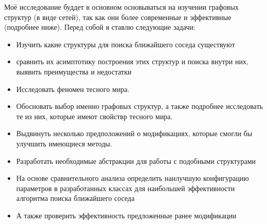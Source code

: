 \begin{justify}
    Моё исследование буддет в основном основываться на изучении
    графовых структур (в виде сетей), так как они более современные
    и эффективные (подробнее ниже). Перед собой я ставлю следующие 
    задачи:
    \begin{itemize}
        \item Изучить какие структуры для поиска ближайшего соседа существуют
        \item сравнить их асимптотику построения этих структур и поиска 
        внутри них, выявить преимущества и недостатки 
        \item Исследовать феномен тесного мира.
        \item Обосновать выбор именно графовых структур, а также подробнее 
        исследовать те из них, которые имеют свойствр тесного мира.
        \item Выдвинуть несколько предположений о модификациях, которые
        смогли бы улучшить имеющиеся методы.
        \item Разработать необходимые абстракции для работы с подобными
        структурами
        \item На основе сравнительного анализа определить наилучшую
        конфигурацию параметров в разработанных классах для наибольшей
        эффективности алгоритма поиска ближайшего соседа
        \item А также проверить эффективность предложенные ранее модификации
    \end{itemize}    
    

\end{justify}


